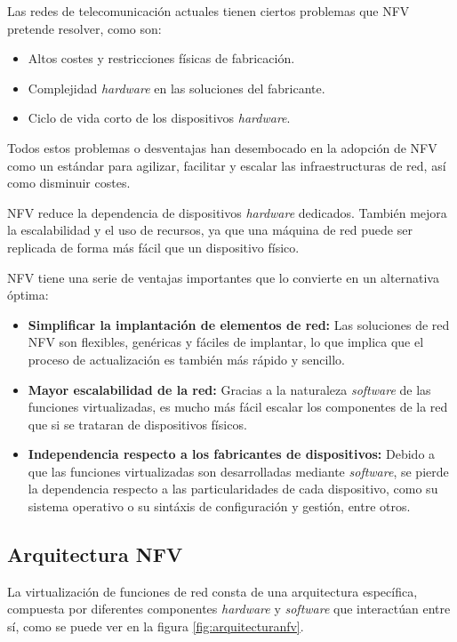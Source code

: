 Las redes de telecomunicación actuales tienen ciertos problemas que NFV pretende resolver, como son:

\begin{itemize}
	\item Altos costes y restricciones físicas de fabricación.
	\item Complejidad \textit{hardware} en las soluciones del fabricante.
	\item Ciclo de vida corto de los dispositivos \textit{hardware}.
\end{itemize}

Todos estos problemas o desventajas han desembocado en la adopción de NFV como un estándar para agilizar, facilitar y escalar las infraestructuras de red, así como disminuir costes.

NFV reduce la dependencia de dispositivos \textit{hardware} dedicados. También mejora la escalabilidad y el uso de recursos, ya que una máquina de red puede ser replicada de forma más fácil que un dispositivo físico.

NFV tiene una serie de ventajas importantes que lo convierte en un alternativa óptima:

\begin{itemize}
	\item \textbf{Simplificar la implantación de elementos de red:} Las soluciones de red NFV son flexibles, genéricas y fáciles de implantar, lo que implica que el proceso de actualización es también más rápido y sencillo.
	
	\item \textbf{Mayor escalabilidad de la red:} Gracias a la naturaleza \textit{software} de las funciones virtualizadas, es mucho más fácil escalar los componentes de la red que si se trataran de dispositivos físicos.
	
	\item \textbf{Independencia respecto a los fabricantes de dispositivos:} Debido a que las funciones virtualizadas son desarrolladas mediante \textit{software}, se pierde la dependencia respecto a las particularidades de cada dispositivo, como su sistema operativo o su sintáxis de configuración y gestión, entre otros.
\end{itemize}

\subsection{Arquitectura NFV}
\label{subsec:nfvarq}

La virtualización de funciones de red consta de una arquitectura específica, compuesta por diferentes componentes \textit{hardware} y \textit{software} que interactúan entre sí, como se puede ver en la figura \ref{fig:arquitecturanfv}.

